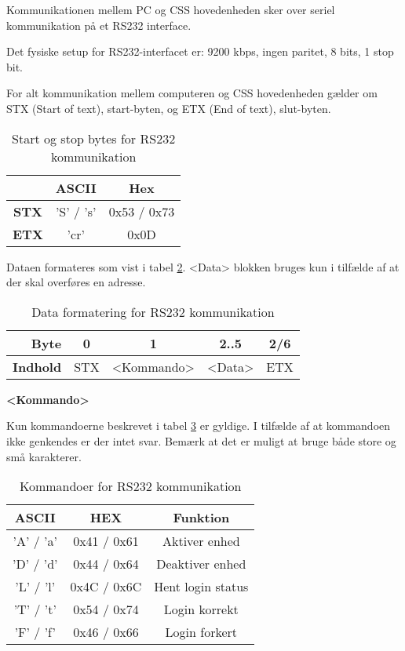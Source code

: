 Kommunikationen mellem PC og CSS hovedenheden sker over seriel kommunikation på et RS232 interface.

Det fysiske setup for RS232-interfacet er: 9200 kbps, ingen paritet, 8 bits, 1 stop bit.

For alt kommunikation mellem computeren og CSS hovedenheden gælder om STX (Start of text), start-byten, og ETX (End of text), slut-byten.

\begin{table}[h]
	\caption{Start og stop bytes for RS232 kommunikation}
	\centering
	\begin{tabular}{|c|c|c|}
		\hline 
		& ASCII & Hex \\ 
		\hline 
		\textbf{STX} & 'S' / 's' & 0x53 / 0x73 \\ 
		\hline 
		\textbf{ETX} & 'cr' & 0x0D \\ 
		\hline 
	\end{tabular} 
	\label{table:RS232StartStopBytes}
\end{table}


Dataen formateres som vist i tabel \ref{table:RS232DataFormat}. <Data> blokken bruges kun i tilfælde af at der skal overføres en adresse.

\begin{table}[h]
	\caption{Data formatering for RS232 kommunikation}
	\centering
	\begin{tabular}{|r|c|c|c|c|}
		\hline 
		\textbf{Byte} & 0 & 1 & 2..5 & 2/6 \\ 
		\hline 
		\textbf{Indhold} & STX & <Kommando> & <Data> & ETX \\ 
		\hline 
	\end{tabular} 
	\label{table:RS232DataFormat}
\end{table}

\textbf{<Kommando>}

Kun kommandoerne beskrevet i tabel \ref{tabel:RS232Kommandoer} er gyldige. I tilfælde af at kommandoen ikke genkendes er der intet svar. Bemærk at det er muligt at bruge både store og små karakterer.

\begin{table}[h]
\caption{Kommandoer for RS232 kommunikation}
\center
\begin{tabular}{|c|c|c|}
\hline 
\textbf{ASCII} & \textbf{HEX} & \textbf{Funktion} \\ 
\hline 
'A' / 'a' & 0x41 / 0x61 & Aktiver enhed \\ 
\hline 
'D' / 'd' & 0x44 / 0x64 & Deaktiver enhed \\ 
\hline 
'L' / 'l' & 0x4C / 0x6C & Hent login status \\ 
\hline 
'T' / 't' & 0x54 / 0x74 & Login korrekt \\ 
\hline 
'F' / 'f' & 0x46 / 0x66 & Login forkert \\ 
\hline
\end{tabular}
\label{tabel:RS232Kommandoer}
\end{table} 

